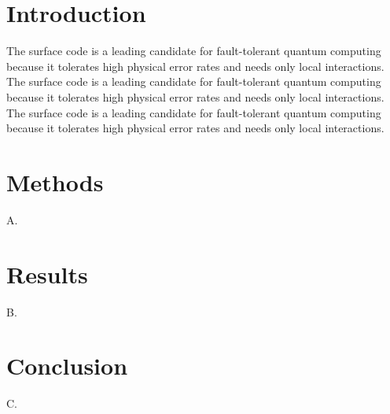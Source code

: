 \documentclass{article}
\begin{document}
\section{Introduction}
The surface code is a leading candidate for fault-tolerant quantum computing because it tolerates high physical error rates and needs only local interactions. The surface code is a leading candidate for fault-tolerant quantum computing because it tolerates high physical error rates and needs only local interactions. The surface code is a leading candidate for fault-tolerant quantum computing because it tolerates high physical error rates and needs only local interactions.
\section{Methods}A.
\section{Results}B.
\section{Conclusion}C.
\end{document}
